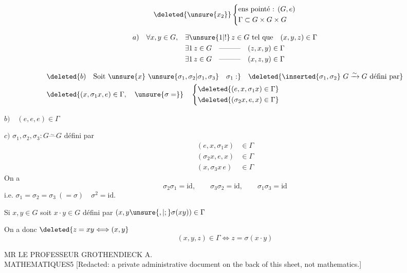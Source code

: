\[
\deleted{\unsure{x_2}}\left\{\begin{aligned}
&\text{ens pointé : }(G,e)\\
&\Gamma\subset G\times G\times G
\end{aligned}\right.
\]

\[
\begin{aligned}
a)\quad\forall x,y\in G,\quad &\exists\unsure{1|!}\,z\in G\ \text{tel que}\quad (x,y,z)\in\Gamma\\
&\exists1\,z\in G\quad\text{---------}\quad(z,x,y)\in\Gamma\\
&\exists1\,z\in G\quad\text{---------}\quad(x,z,y)\in\Gamma
\end{aligned}
\]

\[
\begin{aligned}
&\deleted{b)\quad\text{Soit }\unsure{x}\ \unsure{\sigma_1,\sigma_2|\sigma_1,\sigma_3}\quad\sigma_1:}
 \quad\deleted{\inserted{\sigma_1,\sigma_2}\ G\xrightarrow{\sim}G\ \text{défini par}}\\
&\deleted{(x,\sigma_1 x,e)\in\Gamma,\quad\unsure{\sigma=}}
\quad\left\{\begin{aligned}
&\deleted{(e,x,\sigma_1 x)\in\Gamma}\\
&\deleted{(\sigma_2 x,e,x)\in\Gamma}
\end{aligned}\right.
\end{aligned}
\]

$b)\quad(e,e,e)\in\Gamma$

$c)$  $\sigma_1,\sigma_2,\sigma_3:G\overset{\sim}{\text{---}}G$ défini par
\[
\begin{aligned}
(e,x,\sigma_1x)&\in\Gamma\\
(\sigma_2x,e,x)&\in\Gamma\\
(x,\sigma_3x\, e)&\in\Gamma
\end{aligned}
\]
On a 
\[
\sigma_2\sigma_1=\mathrm{id},\qquad\sigma_3\sigma_2=\mathrm{id},\qquad\sigma_1\sigma_3=\mathrm{id}
\]
i.e. $\sigma_1=\sigma_2=\sigma_3\ (=\sigma)\quad\sigma^2=\mathrm{id}$.

Si $x,y\in G$ soit $x\cdot y\in G$ défini par $(x,y\unsure{,|;}\sigma(xy))\in\Gamma$

On a donc $\deleted{z=xy\Longleftrightarrow (x,y}$
\[
(x,y,z)\in\Gamma\Longleftrightarrow z=\sigma(x\cdot y)
\]

MR LE PROFESSEUR GROTHENDIECK A.\\
MATHEMATIQUES\hfill 5
[Redacted: a private administrative document on the back of this sheet, not mathematics.]

